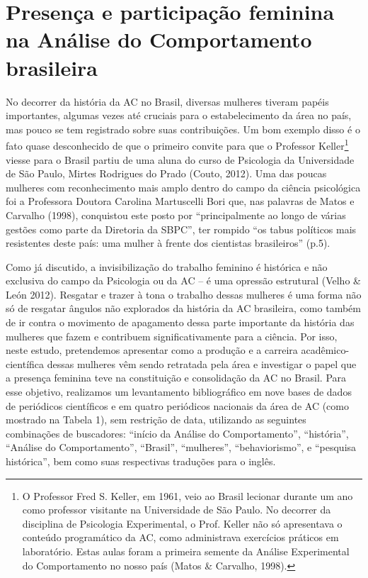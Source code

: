 \section{Presença e participação feminina na Análise do Comportamento brasileira}

No decorrer da história da AC no Brasil, diversas mulheres tiveram papéis importantes, algumas vezes até cruciais para o estabelecimento da área no país, mas pouco se tem registrado sobre suas contribuições. Um bom exemplo disso é o fato quase desconhecido de que o primeiro convite para que o Professor Keller\footnote{O Professor Fred S. Keller, em 1961, veio ao Brasil lecionar durante um ano como professor visitante na Universidade de São Paulo. No decorrer da disciplina de Psicologia Experimental, o Prof. Keller não só apresentava o conteúdo programático da AC, como administrava exercícios práticos em laboratório. Estas aulas foram a primeira semente da Análise Experimental do Comportamento no nosso país (Matos \& Carvalho, 1998).} viesse para o Brasil partiu de uma aluna do curso de Psicologia da Universidade de São Paulo, Mirtes Rodrigues do Prado (Couto, 2012). Uma das poucas mulheres com reconhecimento mais amplo dentro do campo da ciência psicológica foi a Professora Doutora Carolina Martuscelli Bori que, nas palavras de Matos e Carvalho (1998), conquistou este posto por ``principalmente ao longo de várias gestões como parte da Diretoria da SBPC'', ter rompido ``os tabus políticos mais resistentes deste país: uma mulher à frente dos cientistas brasileiros'' (p.5).

Como já discutido, a invisibilização do trabalho feminino é histórica e não exclusiva do campo da Psicologia ou da AC – é uma opressão estrutural (Velho \& León 2012). Resgatar e trazer à tona o trabalho dessas mulheres é uma forma não só de resgatar ângulos não explorados da história da AC brasileira, como também de ir contra o movimento de apagamento dessa parte importante da história das mulheres que fazem e contribuem significativamente para a ciência. Por isso, neste estudo, pretendemos apresentar como a produção e a carreira acadêmico-científica dessas mulheres vêm sendo retratada pela área e investigar o papel que a presença feminina teve na constituição e consolidação da AC no Brasil. Para esse objetivo, realizamos um levantamento bibliográfico em nove bases de dados de periódicos científicos e em quatro periódicos nacionais da área de AC (como mostrado na Tabela 1), sem restrição de data, utilizando as seguintes combinações de buscadores: ``início da Análise do Comportamento'', ``história'', ``Análise do Comportamento'', ``Brasil'', ``mulheres'', ``behaviorismo'', e ``pesquisa histórica'', bem como suas respectivas traduções para o inglês.

